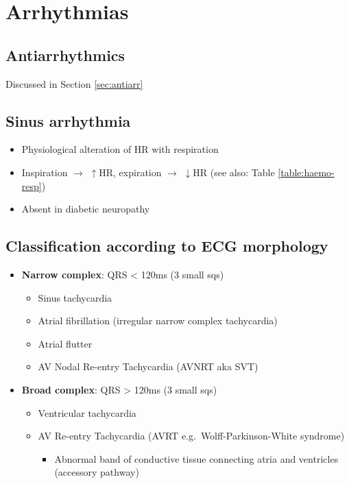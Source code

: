 \documentclass[
  12pt,
]{memoir}
\providecommand{\tightlist}{%
  \setlength{\itemsep}{0pt}\setlength{\parskip}{0pt}}
\begin{document}
\hypertarget{arrhythmias}{%
\section{Arrhythmias}\label{arrhythmias}}

\hypertarget{antiarrhythmics}{%
\subsection{Antiarrhythmics}\label{antiarrhythmics}}

Discussed in Section \ref{sec:antiarr}

\hypertarget{sinus-arrhythmia}{%
\subsection{Sinus arrhythmia}\label{sinus-arrhythmia}}

\begin{itemize}
\tightlist
\item
  Physiological alteration of HR with respiration
\item
  Inspiration \(\rightarrow\) \(\uparrow\)HR, expiration \(\rightarrow\)
  \(\downarrow\)HR (see also: Table \ref{table:haemo-resp})
\item
  Absent in diabetic neuropathy
\end{itemize}

\hypertarget{classification-according-to-ecg-morphology}{%
\subsection{Classification according to ECG
morphology}\label{classification-according-to-ecg-morphology}}

\begin{itemize}
\tightlist
\item
  \textbf{Narrow complex}: QRS \textless{} 120ms (3 small sqs)

  \begin{itemize}
  \tightlist
  \item
    Sinus tachycardia
  \item
    Atrial fibrillation (irregular narrow complex tachycardia)
  \item
    Atrial flutter
  \item
    AV Nodal Re-entry Tachycardia (AVNRT aka SVT)
  \end{itemize}
\item
  \textbf{Broad complex}: QRS \textgreater{} 120ms (3 small sqs)

  \begin{itemize}
  \tightlist
  \item
    Ventricular tachycardia
  \item
    AV Re-entry Tachycardia (AVRT e.g.~Wolff-Parkinson-White syndrome)

    \begin{itemize}
    \tightlist
    \item
      Abnormal band of conductive tissue connecting atria and ventricles
      (accessory pathway)
    \end{itemize}
  \end{itemize}
\end{itemize}
\end{document}
